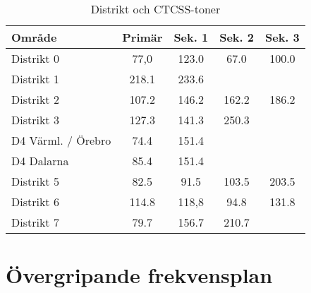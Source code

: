 \begin{table}[H]
\centering
\begin{tabular}{lcccc}
	\textbf{Område}    & \textbf{Primär} & \textbf{Sek. 1} & \textbf{Sek. 2} & \textbf{Sek. 3} \\ \hline
	Distrikt 0         & 77,0            & 123.0           & 67.0            & 100.0           \\
	Distrikt 1         & 218.1           & 233.6           &                 &                 \\
	Distrikt 2         & 107.2           & 146.2           & 162.2           & 186.2           \\
	Distrikt 3         & 127.3           & 141.3           & 250.3           &                 \\
	D4 Värml. / Örebro & 74.4            & 151.4           &                 &                 \\
	D4 Dalarna         & 85.4            & 151.4           &                 &                 \\
	Distrikt 5         & 82.5            & 91.5            & 103.5           & 203.5           \\
	Distrikt 6         & 114.8           & 118,8           & 94.8            & 131.8           \\
	Distrikt 7         & 79.7            & 156.7           & 210.7           & 
\end{tabular}
\caption{Distrikt och CTCSS-toner}
\end{table}

\newpage

\section{Övergripande frekvensplan}

